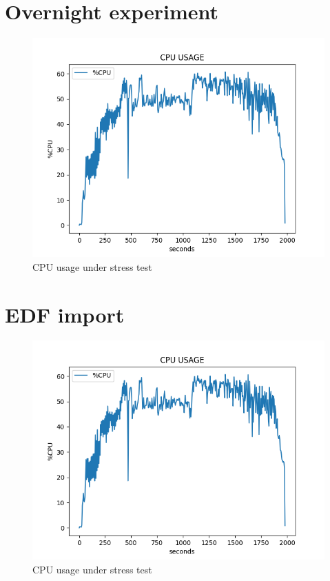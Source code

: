 \section{Overnight experiment}
\begin{figure}
    \centering
    \includegraphics[width=1.0\textwidth]{Figures/StressTest.png}
    \caption{CPU usage under stress test}
    \label{fig:Figures/OVERNIGHT_RESULT}
\end{figure}
\section{EDF import}
\begin{figure}
    \centering
    \includegraphics[width=1.0\textwidth]{Figures/StressTest.png}
    \caption{CPU usage under stress test}
    \label{fig:Figures/EDFIMP_RESULT}
\end{figure}
